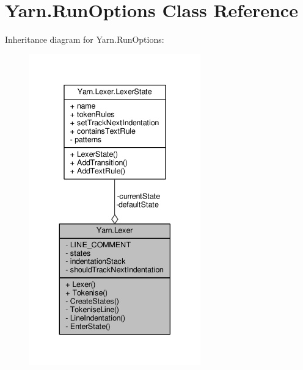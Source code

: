 \hypertarget{a00142}{\section{Yarn.\-Run\-Options Class Reference}
\label{a00142}
}


Inheritance diagram for Yarn.\-Run\-Options\-:
\nopagebreak
\begin{figure}[H]
\begin{center}
\leavevmode
\includegraphics[width=210pt]{a00651}
\end{center}
\end{figure}


